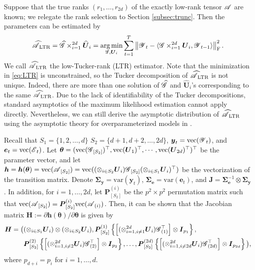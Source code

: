 \documentclass[12pt]{article}
\newcommand{\bm}{\boldsymbol}
\newcommand{\cm}[1]{\mbox{\boldmath$\mathscr{#1}$}}
\begin{document}
Suppose that the true ranks $(r_1,\dots,r_{2d})$ of the exactly low-rank tensor $\cm{A}$ are known; we relegate the rank selection to Section \ref{subsec:trunc}. Then the parameters can be estimated by
\begin{equation}\label{eq:LTR}
\cm{\widehat{A}}_{\text{LTR}}=\cm{\widehat{G}}\times_{i=1}^{2d}\bm{\widehat{U}}_i=\underset{\scalebox{0.7}{\cm{G}},\bm{U}_i}{\arg\min}\sum_{t=1}^T\left\|\cm{Y}_t-\langle\cm{G}\times_{i=1}^{2d}\bm{U}_i,\cm{Y}_{t-1}\rangle\right\|_\textup{F}^2.
\end{equation}
We call $\cm{\widehat{A}}_{\text{LTR}}$ the low-Tucker-rank (LTR) estimator. Note that the minimization in \eqref{eq:LTR} is unconstrained, so the Tucker decomposition of $\cm{\widehat{A}}_{\text{LTR}}$ is not unique. Indeed, there are more than one solution of $\cm{\widehat{G}}$ and $\bm{\widehat{U}}_i$'s corresponding to the same $\cm{\widehat{A}}_{\text{LTR}}$. Due to the lack of identifiability of the Tucker decompositions, standard asymptotics of the maximum likelihood estimation cannot apply directly. Nevertheless, we  can still derive the asymptotic distribution of $\cm{\widehat{A}}_{\text{LTR}}$ using the asymptotic theory  for  overparameterized models in \cite{shapiro1986asymptotic}.


Recall that $S_1=\{1,2,\dots,d\}$ $S_2=\{d+1,d+2,\dots,2d\}$, $\bm{y}_t=\text{vec}(\cm{Y}_t)$, and $\bm{e}_t=\text{vec}(\cm{E}_t)$.
Let $\bm{\theta}=(\text{vec}(\cm{G}_{[S_2]})^\top,\text{vec}(\bm{U}_1)^\top,\cdots, \text{vec}(\bm{U}_{2d})^\top)^\top$ be the parameter vector, and  let $\bm{h}=\bm{h}(\bm{\theta})=\text{vec}(\cm{A}_{[S_2]})=\text{vec}((\otimes_{i\in S_2}\bm{U}_i)\cm{G}_{[S_2]}(\otimes_{i\in S_1}\bm{U}_i)^\top)$ be the vectorization of the transition matrix. Denote  $\bm{\Sigma}_{\bm{y}}=\text{var}(\bm{y}_t)$, $\bm{\Sigma}_{\bm{e}}=\text{var}(\bm{e}_t)$, and  $\bm{J}=\bm{\Sigma}_{\bm{e}}^{-1}\otimes\bm{\Sigma}_{\bm{y}}$. In addition, for $i=1,\dots, 2d$, let $\bm{P}_{[S_2]}^{(i)}$ be the $p^2\times p^2$ permutation matrix such that $\text{vec}(\cm{A}_{[S_2]})=\bm{P}_{[S_2]}^{(i)}\text{vec}(\cm{A}_{(i)})$. Then, it can be shown that the Jacobian matrix $\bm{H}:={\partial\bm{h}(\bm{\theta})}/{\partial\bm{\theta}}$ is given by
\begin{equation}\label{eq:H}\begin{split}
\bm{H}
=\big( &(\otimes_{i\in S_1}\bm{U}_i)\otimes(\otimes_{i\in S_2}\bm{U}_i),
\bm{P}^{(1)}_{[S_2]}\left \{\left [(\otimes_{i=1, i\neq 1}^{2d}\bm{U}_i)\cm{G}_{(1)}^\top\right ]\otimes\bm{I}_{p_1}\right \},\\
&\bm{P}^{(2)}_{[S_2]}\left \{\left [(\otimes_{i=1, i\neq 2}^{2d}\bm{U}_i)\cm{G}_{(2)}^\top\right ]\otimes\bm{I}_{p_2}\right \},\dots,
\bm{P}^{(2d)}_{[S_2]}\left \{\left [(\otimes_{i=1, i\neq 2d}^{2d}\bm{U}_i)\cm{G}_{(2d)}^\top\right ]\otimes\bm{I}_{p_{2d}}\right \}\big),
\end{split}\end{equation}
where $p_{d+i}=p_i$ for $i=1,\dots, d$.
\end{document}
